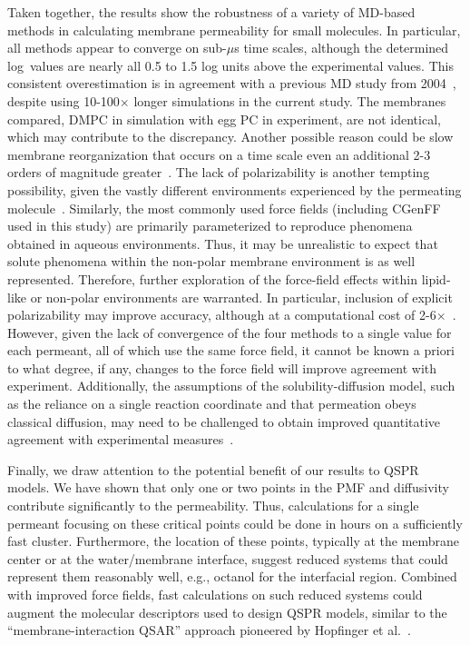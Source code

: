 Taken together, the results show the robustness of a variety of MD-based methods in calculating membrane permeability for small molecules.  In particular, all methods {\color{red} appear to} converge on sub-$\mu$s time scales, although the determined log\perm~values are nearly all 0.5 to 1.5 log units above the experimental values.  This consistent overestimation is in agreement with a previous MD study from 2004~\cite{Bemporad2004}, despite using 10-100$\times$ longer simulations in the current study.  {\color{red} The membranes compared, DMPC in simulation with egg PC in experiment, are not identical, which may contribute to the discrepancy.}  Another possible reason could be slow membrane reorganization that occurs on a time scale even an additional 2-3 orders of magnitude greater~\cite{Neale2011}.  The lack of polarizability is another tempting possibility, given the vastly different environments experienced by the permeating molecule~\cite{Riahi2014}.  
Similarly, the most commonly used force fields (including CGenFF used in this study) are primarily parameterized to reproduce phenomena obtained in aqueous environments. Thus, it may be unrealistic to expect that solute phenomena within the non-polar membrane environment is as well represented. Therefore, further exploration of the force-field effects within lipid-like or non-polar environments are warranted.  In particular, inclusion of explicit polarizability may improve accuracy, although at a computational cost of 2-6$\times$~\cite{Chowdhary2013,Wang2013}.  {\color{red} However, given the lack of convergence of the four methods to a single value for each permeant, all of which use the same force field, it cannot be known a priori to what degree, if any, changes to the force field will improve agreement with experiment.}
Additionally, the assumptions of the solubility-diffusion model, such as the reliance on a single reaction coordinate and that permeation obeys classical diffusion, may need to be challenged to obtain improved quantitative agreement with experimental measures~\cite{Orsi2010,Parisio2013,Comer2014}.

Finally, we draw attention to the potential benefit of our results to QSPR models.   
We have shown that only one or two points in the PMF and diffusivity contribute significantly to the permeability.  Thus, calculations for a single permeant focusing on these critical points could be done in hours on a sufficiently fast cluster.  Furthermore, the location of these points, typically at the membrane center or at the water/membrane interface, suggest reduced systems that could represent them reasonably well, e.g., octanol for the interfacial region.  
Combined with improved force fields, fast calculations on such reduced systems could augment the molecular descriptors used to design QSPR models, similar to the ``membrane-interaction QSAR'' approach pioneered by Hopfinger et al.~\cite{Kulkarni1999,Tseng2012}.



